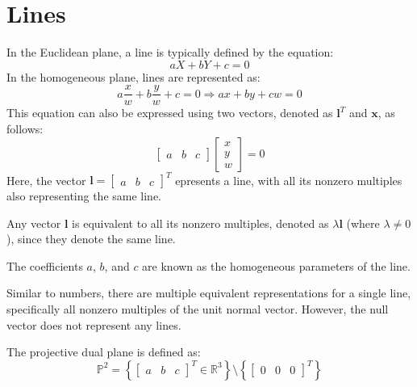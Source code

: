 \section{Lines}

In the Euclidean plane, a line is typically defined by the equation:
\[aX+bY+c=0\]
In the homogeneous plane, lines are represented as:
\[a\dfrac{x}{w}+b \dfrac{y}{w}+c=0 \Longrightarrow ax+by+cw=0\]
This equation can also be expressed using two vectors, denoted as $\mathbf{l}^T$ and $\mathbf{x}$, as follows:
\[\begin{bmatrix} a & b & c \end{bmatrix} \begin{bmatrix} x \\ y \\ w \end{bmatrix}=0\]
Here, the vector $\mathbf{l}={\begin{bmatrix} a & b & c \end{bmatrix}}^T$ epresents a line, with all its nonzero multiples also representing the same line.
\begin{property}[Homogeneity]
    Any vector $\mathbf{l}$ is equivalent to all its nonzero multiples, denoted as $\lambda \mathbf{l}$ (where $\lambda\neq 0$), since they denote the same line.
\end{property}
The coefficients $a$, $b$, and $c$ are known as the homogeneous parameters of the line.

Similar to numbers, there are multiple equivalent representations for a single line, specifically all nonzero multiples of the unit normal vector. 
However, the null vector does not represent any lines.
\begin{definition}
    The projective dual plane is defined as:
    \[\mathbb{P}^2=\left\{{\begin{bmatrix} a & b & c \end{bmatrix}}^T \in \mathbb{R}^3\right\}\setminus\left\{{\begin{bmatrix} 0 & 0 & 0 \end{bmatrix}}^T\right\}\]
\end{definition}

